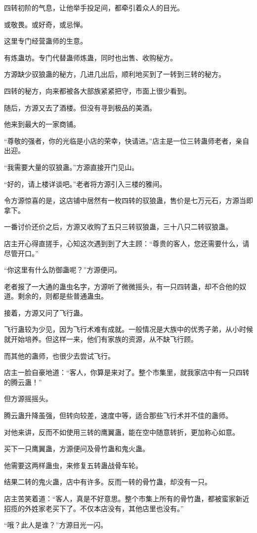 \begin{this_body}
四转初阶的气息，让他举手投足间，都牵引着众人的目光。

或敬畏。或好奇，或忌惮。

这里专门经营蛊师的生意。

有炼蛊坊。专门代替蛊师炼蛊，同时也出售、收购秘方。

方源缺少驭狼蛊的秘方，几进几出后，顺利地买到了一转到三转的秘方。

四转的秘方，向来都被各大部族紧紧把守，市面上很少看到。

随后，方源又去了酒楼。但没有寻到极品的美酒。

他来到最大的一家商铺。

“尊敬的强者，你的光临是小店的荣幸，快请进。”店主是一位三转蛊师老者，亲自出迎。

“我需要大量的驭狼蛊。”方源直接开门见山。

“好的，请上楼详谈吧。”老者将方源引入三楼的雅间。

令方源惊喜的是，这店铺中居然有一枚四转的驭狼蛊，售价是七万元石，方源当即拿下。

一番讨价还价之后，方源又收购了五只三转驭狼蛊，三十八只二转驭狼蛊。

店主开心得直搓手，心知这次遇到到了大主顾：“尊贵的客人，您还需要什么，请尽管开口。”

“你这里有什么防御蛊呢？”方源便问。

老者报了一大通的蛊虫名字，方源听了微微摇头，有一只四转蛊，却不合他的奴道。剩余的，则都是些普通蛊虫。

接着，方源又问了飞行蛊。

飞行蛊较为少见，因为飞行术难有成就。一般情况是大族中的优秀子弟，从小时候就开始培养。但这样一来，他们有家族的资源，从不缺飞行顾。

而其他的蛊师，也很少去尝试飞行。

店主一脸自豪地道：“客人，你算是来对了。整个市集里，就我家店中有一只四转的腾云蛊！”

但方源摇摇头。

腾云蛊升降虽强，但转向较差，速度中等，适合那些飞行术并不佳的蛊师。

对他来讲，反而不如使用三转的鹰翼蛊，能在空中随意转折，更加称心如意。

买下一只鹰翼蛊，方源便问及骨竹蛊和鬼火蛊。

他需要这两样蛊虫，来修复五转蛊战骨车轮。

结果二转的鬼火蛊，店中有许多。反而一转的骨竹蛊，却没有一只。

店主苦笑着道：“客人，真是不好意思。整个市集上所有的骨竹蛊，都被蛮家新近招揽的外姓家老买下了。不仅本店没有，其他店里也没有。”

“哦？此人是谁？”方源目光一闪。

\end{this_body}

